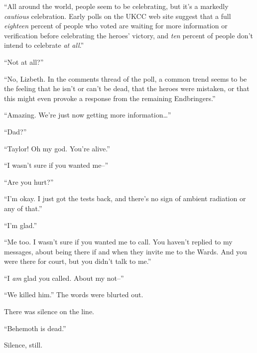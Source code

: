 ``All around the world, people seem to be celebrating, but it's a markedly \emph{cautious} celebration.  Early polls on the UKCC web site suggest that a full \emph{eighteen} percent of people who voted are waiting for more information or verification before celebrating the heroes' victory, and \emph{ten} percent of people don't intend to celebrate \emph{at all}.''



``Not at all?''



``No, Lizbeth.  In the comments thread of the poll, a common trend seems to be the feeling that he isn't or can't be dead, that the heroes were mistaken, or that this might even provoke a response from the remaining Endbringers.''



``Amazing.  We're just now getting more information\ldots''



\sectionbreak



``Dad?''



``Taylor!  Oh my god.  You're alive.''



``I wasn't sure if you wanted me--''



``Are you hurt?''



``I'm okay.  I just got the tests back, and there's no sign of ambient radiation or any of that.''



``I'm glad.''



``Me too.  I wasn't sure if you wanted me to call.  You haven't replied to my messages, about being there if and when they invite me to the Wards.  And you were there for court, but you didn't talk to me.''



``I \emph{am} glad you called.  About my not--''



``We killed him.''  The words were blurted out.



There was silence on the line.



``Behemoth is dead.''



Silence, still.



